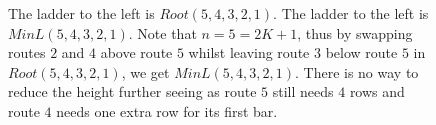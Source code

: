 \begin{center}
\begin{figure}[!htp]
\begin{minipage}{.4\textwidth}
\begin{tikzpicture}
    
                \end{tikzpicture}
            \end{minipage}
            \caption{The ladder to the left is $Root(5,4,3,2,1)$. The ladder to the left is $MinL(5,4,3,2,1)$. Note that $n=5=2K+1$, thus 
            by swapping routes $2$ and $4$ above route $5$ whilst leaving route $3$ below route $5$ in $Root(5,4,3,2,1)$, we get 
            $MinL(5,4,3,2,1)$. There is no way to reduce the height further seeing as route $5$ still needs 
            $4$ rows and route $4$ needs one extra row for its first bar.}
            \label{Fig:RootToMinLadder}
        \end{figure}   

   \end{center}
   
